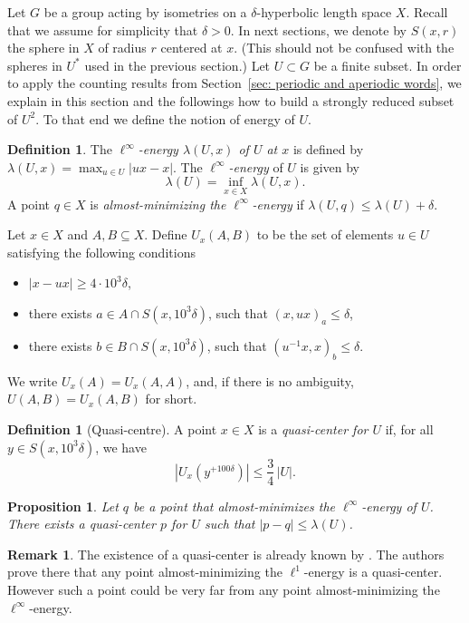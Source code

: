 \documentclass[JEP,XML,SOM,Unicode, NoEqCountersInSection,published]{cedram}
\theoremstyle{plain}
\newtheorem{prop}[thm]{Proposition}
\theoremstyle{definition}
\newtheorem{df}[thm]{Definition}
\newtheorem{rem}[thm]{Remark}
\begin{document}
Let $G$ be a group acting by isometries on a $\delta$-hyperbolic length space $X$.
Recall that we assume for simplicity that $\delta > 0$.
In next sections, we denote by $S(x,r)$ the sphere in $X$ of radius $r$ centered at $x$.
(This should not be confused with the spheres in $U^*$ used in the previous section.)
Let $U\subset G$ be a finite subset.
In order to apply the counting results from Section~\ref{sec: periodic and aperiodic words}, we explain in this section and the followings how to build a strongly reduced subset of $U^2$.
To that end we define the notion of energy of $U$.

\begin{df}
The \emph{$\ell^{\infty}$-energy $\lambda(U,x)$ of $U$ at $x$} is defined by
$\lambda(U,x) = \max_{u\in U} |ux-x|$.
The \emph{$\ell^{\infty}$-energy} of $U$ is given by
\[
\lambda(U)=\inf_{x\in X} \lambda(U,x).
\]
A point $q\in X$ is \emph{almost-minimizing the $ \ell^{\infty}$-energy} if $\lambda(U,q)\leqslant \lambda(U)+\delta$.
\end{df}

\label{sec: quasi-centre}
Let $x \in X$ and $A, B \subseteq X$.
Define $U_x(A,B)$ to be the set of elements $u \in U$ satisfying the following conditions
\begin{itemize}
\item $|x - ux| \geq 4 \cdot 10^3\delta$,
\item there exists $a \in A \cap S(x,10^3\delta)$, such that $(x,ux)_{a}\leqslant \delta$,
\item there exists $b \in B \cap S(x,10^3\delta)$, such that $(u^{-1}x,x)_b\leqslant \delta$.
\end{itemize}
We write $U_x(A)=U_x(A,A)$, and, if there is no ambiguity, $U(A,B)=U_x(A,B)$ for short.

\begin{df}[Quasi-centre]
A point $x\in X$ is a \emph{quasi-center for $U$} if, for all $y\in S(x,10^3\delta)$, we have
\[
\left|U_x\left(y^{+100\delta}\right)\right|\leqslant \frac{3}{4}\, |U|.
\]
\end{df}

\begin{prop}\label{P: quasi-centre}
Let $q$ be a point that almost-minimizes the $\ell^{\infty}$-energy of $U$.
There exists a quasi-center $p$ for $U$ such that $| p - q | \leqslant \lambda (U)$.
\end{prop}
\begin{rem} The existence of a quasi-center is already known by \cite{delzant_product_2020}.
The authors prove there that any point almost-minimizing the $\ell^1$-energy is a quasi-center.
However such a point could be very far from any point almost-minimizing the $\ell^\infty$-energy.
\end{rem}
\end{document}
